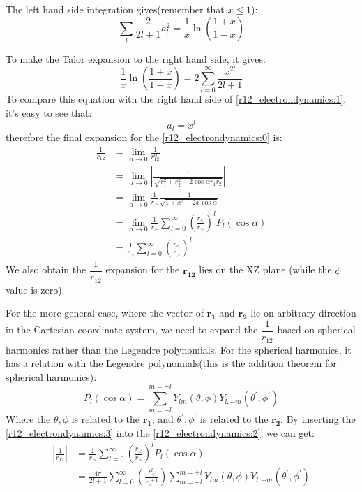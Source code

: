 The left hand side integration gives(remember that $x\leq 1$):
\begin{equation}
 \sum_{l}\frac{2}{2l+1}a_{l}^{2} = \frac{1}{x}\ln\left( \frac{1+x}{1-x}\right) 
\end{equation}

To make the Talor expansion to the right hand side, it gives:
\begin{equation}
 \frac{1}{x}\ln\left( \frac{1+x}{1-x}\right) = 
 2\sum_{l=0}^{\infty}\frac{x^{2l}}{2l+1}
\end{equation}
To compare this equation with the right hand side of \ref{r12_electrondynamics:1},
it's easy to see that:
\begin{equation}
 a_{l} = x^{l}
\end{equation}
therefore the final expansion for the \ref{r12_electrondynamics:0} is:
\begin{align}\label{r12_electrondynamics:2}
\frac{1}{r_{12}} &= \lim_{\alpha\rightarrow 0} \frac{1}{r_{12}^{\alpha}} \nonumber \\
&=\lim_{\alpha\rightarrow 0}
\left| \frac{1}{\sqrt{r_{1}^{2}+r_{2}^{2}-2\cos \alpha r_{1}r_{2}}}\right| \nonumber \\
&= \lim_{\alpha\rightarrow 0}\frac{1}{r_{>}} \frac{1}{\sqrt{1+x^{2}-2x\cos \alpha }} 
\nonumber \\
&= \lim_{\alpha\rightarrow 0}\frac{1}{r_{>}}\sum_{l=0}^{\infty}
\left( \frac{r_{<}}{r_{>}}\right)^{l} P_{l}(\cos \alpha) \nonumber \\
&= \frac{1}{r_{>}}\sum_{l=0}^{\infty}
\left( \frac{r_{<}}{r_{>}}\right)^{l}
\end{align}
We also obtain the $\dfrac{1}{r_{12}}$ expansion for the $\bm{r_{12}}$ 
lies on the XZ plane (while the $\phi$ value is zero).

For the more general case, where the vector of $\bm{r_{1}}$ and $\bm{r_{2}}$
lie on arbitrary direction in the Cartesian coordinate system, we need to expand 
the $\dfrac{1}{r_{12}}$ based on spherical harmonics rather than the Legendre 
polynomials. For the spherical harmonics, it has a relation with the 
Legendre polynomials(this is the addition theorem for spherical harmonics):
\begin{equation}
\label{r12_electrondynamics:3}
 P_{l}(\cos \alpha) = \sum_{m=-l}^{m=+l}
 Y_{lm}(\theta,\phi)Y_{l,-m}(\theta^{'},\phi^{'})
\end{equation}
Where the $\theta,\phi$ is related to the $\bm{r_{1}}$, and $\theta^{'},\phi^{'}$
is related to the $\bm{r_{2}}$. By inserting the \ref{r12_electrondynamics:3}
into the \ref{r12_electrondynamics:2}, we can get:
\begin{align}
\label{r12_electrondynamics:4}
|\frac{1}{r_{12}}| &= \frac{1}{r_{>}}\sum_{l=0}^{\infty}
\left( \frac{r_{<}}{r_{>}}\right)^{l} P_{l}(\cos \alpha) \nonumber \\
&=\frac{4\pi}{2l+1}\sum_{l=0}^{\infty}
\left( \frac{r_{<}^{l}}{r_{>}^{l+1}}\right)\sum_{m=-l}^{m=+l}
 Y_{lm}(\theta,\phi)Y_{l,-m}(\theta^{'},\phi^{'}) 
\end{align}

